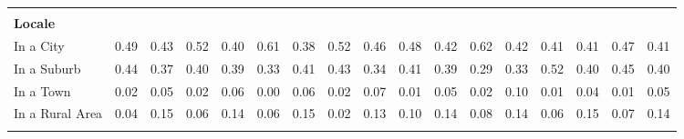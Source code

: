 \begin{tabular*}{\linewidth}{@{\extracolsep{\fill} } lcccccccccccccccc}
&&&&&&&&&&&&&&&&\\%
\multicolumn{17}{l}{\bfseries Locale}\\%
\hspace{0.2cm}In a City&0.49&0.43&0.52&0.40&0.61&0.38&0.52&0.46&0.48&0.42&0.62&0.42&0.41&0.41&0.47&0.41\\%
\hspace{0.2cm}In a Suburb&0.44&0.37&0.40&0.39&0.33&0.41&0.43&0.34&0.41&0.39&0.29&0.33&0.52&0.40&0.45&0.40\\%
\hspace{0.2cm}In a Town&0.02&0.05&0.02&0.06&0.00&0.06&0.02&0.07&0.01&0.05&0.02&0.10&0.01&0.04&0.01&0.05\\%
\hspace{0.2cm}In a Rural Area&0.04&0.15&0.06&0.14&0.06&0.15&0.02&0.13&0.10&0.14&0.08&0.14&0.06&0.15&0.07&0.14\\%
&&&&&&&&&&&&&&&&\\%
\hline%
\end{tabular*}